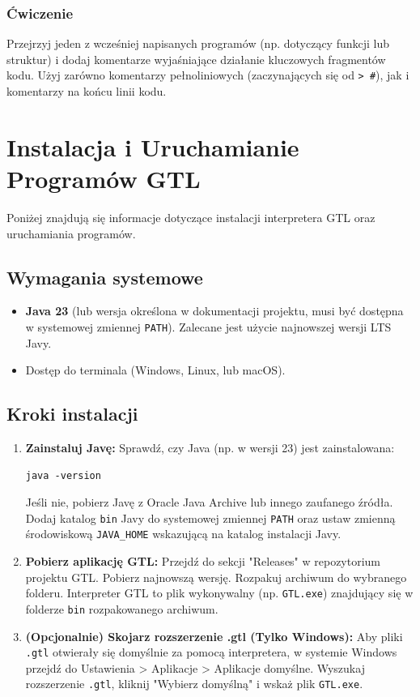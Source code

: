 \documentclass[12pt,a4paper]{article}
\begin{document}
\subsubsection*{Ćwiczenie}
Przejrzyj jeden z wcześniej napisanych programów (np. dotyczący funkcji lub struktur) i dodaj komentarze wyjaśniające działanie kluczowych fragmentów kodu. Użyj zarówno komentarzy pełnoliniowych (zaczynających się od \texttt{> \#}), jak i komentarzy na końcu linii kodu.

\newpage
\appendix
\section{Instalacja i Uruchamianie Programów GTL}
\label{app:installation}
Poniżej znajdują się informacje dotyczące instalacji interpretera GTL oraz uruchamiania programów.

\subsection{Wymagania systemowe}
\begin{itemize}
    \item \textbf{Java 23} (lub wersja określona w dokumentacji projektu, musi być dostępna w systemowej zmiennej \texttt{PATH}). Zalecane jest użycie najnowszej wersji LTS Javy.
    \item Dostęp do terminala (Windows, Linux, lub macOS).
\end{itemize}

\subsection{Kroki instalacji}
\begin{enumerate}
    \item \textbf{Zainstaluj Javę:}
    Sprawdź, czy Java (np. w wersji 23) jest zainstalowana:
    \begin{verbatim}
java -version
    \end{verbatim}
    Jeśli nie, pobierz Javę z Oracle Java Archive lub innego zaufanego źródła. Dodaj katalog \texttt{bin} Javy do systemowej zmiennej \texttt{PATH} oraz ustaw zmienną środowiskową \texttt{JAVA\_HOME} wskazującą na katalog instalacji Javy.

    \item \textbf{Pobierz aplikację GTL:}
    Przejdź do sekcji "Releases" w repozytorium projektu GTL. Pobierz najnowszą wersję. Rozpakuj archiwum do wybranego folderu. Interpreter GTL to plik wykonywalny (np. \texttt{GTL.exe}) znajdujący się w folderze \texttt{bin} rozpakowanego archiwum.

    \item \textbf{(Opcjonalnie) Skojarz rozszerzenie .gtl (Tylko Windows):}
    Aby pliki \texttt{.gtl} otwierały się domyślnie za pomocą interpretera, w systemie Windows przejdź do Ustawienia > Aplikacje > Aplikacje domyślne. Wyszukaj rozszerzenie \texttt{.gtl}, kliknij "Wybierz domyślną" i wskaż plik \texttt{GTL.exe}.
\end{enumerate}
\end{document}
